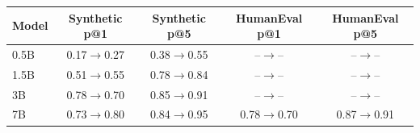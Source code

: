 \begin{tabular}{lcccc}
\toprule
Model & Synthetic p@1 & Synthetic p@5 & HumanEval p@1 & HumanEval p@5 \\
\midrule
0.5B & 0.17$\to$0.27 & 0.38$\to$0.55 & --$\to$-- & --$\to$-- \\
1.5B & 0.51$\to$0.55 & 0.78$\to$0.84 & --$\to$-- & --$\to$-- \\
3B & 0.78$\to$0.70 & 0.85$\to$0.91 & --$\to$-- & --$\to$-- \\
7B & 0.73$\to$0.80 & 0.84$\to$0.95 & 0.78$\to$0.70 & 0.87$\to$0.91 \\
\bottomrule
\end{tabular}
